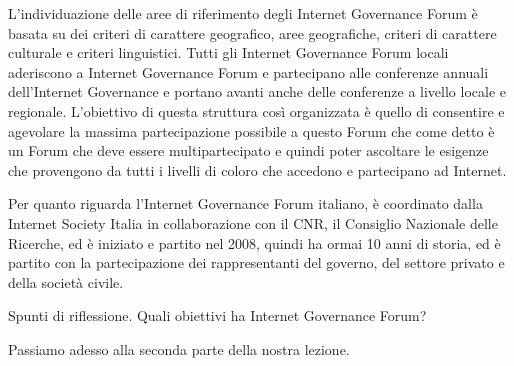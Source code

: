 L'individuazione delle aree di riferimento degli Internet Governance Forum è basata su dei criteri di carattere geografico, aree geografiche, criteri di carattere culturale e criteri linguistici. Tutti gli Internet Governance Forum locali aderiscono a Internet Governance Forum e partecipano alle conferenze annuali dell'Internet Governance e portano avanti anche delle conferenze a livello locale e regionale. L'obiettivo di questa struttura così organizzata è quello di consentire e agevolare la massima partecipazione possibile a questo Forum che come detto è un Forum che deve essere multipartecipato e quindi poter ascoltare le esigenze che provengono da tutti i livelli di coloro che accedono e partecipano ad Internet.\par
Per quanto riguarda l'Internet Governance Forum italiano, è coordinato dalla Internet Society Italia in collaborazione con il CNR, il Consiglio Nazionale delle Ricerche, ed è iniziato e partito nel 2008, quindi ha ormai 10 anni di storia, ed è partito con la partecipazione dei rappresentanti del governo, del settore privato e della società civile.\par
Spunti di riflessione. Quali obiettivi ha Internet Governance Forum? \par
Passiamo adesso alla seconda parte della nostra lezione.

